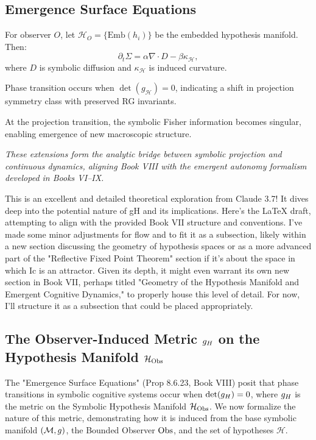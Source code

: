\subsection*{Emergence Surface Equations}
\label{sec:bk8_emergence_surface_equations}
\begin{definition}
\label{definition:bk8_symbolic_hypothesis_manifold}
For observer \( O \), let \( \mathcal{H}_O = \{ \mathrm{Emb}(h_i) \} \) be the embedded hypothesis manifold. Then:
\[
\partial_t \Sigma = \alpha \nabla \cdot D - \beta \kappa_{\mathcal{H}},
\]
where \( D \) is symbolic diffusion and \( \kappa_{\mathcal{H}} \) is induced curvature.
\end{definition}
\begin{proposition}
\label{prop:bk8_critical_projection_point}
Phase transition occurs when \( \det(g_{\mathcal{H}}) = 0 \), indicating a shift in projection symmetry class with preserved RG invariants.
\end{proposition}
\begin{corollary}
\label{corollary:bk8_projection_transition_enabling_structural_emergence}
At the projection transition, the symbolic Fisher information becomes singular, enabling emergence of new macroscopic structure.
\end{corollary}
\begin{center}
\textit{These extensions form the analytic bridge between symbolic projection and continuous dynamics, aligning Book VIII with the emergent autonomy formalism developed in Books VI–IX.}
\end{center}
This is an excellent and detailed theoretical exploration from Claude 3.7! It dives deep into the potential nature of gH and its implications.
Here's the LaTeX draft, attempting to align with the provided Book VII structure and conventions. I've made some minor adjustments for flow and to fit it as a subsection, likely within a new section discussing the geometry of hypothesis spaces or as a more advanced part of the "Reflective Fixed Point Theorem" section if it's about the space in which Ic is an attractor.
Given its depth, it might even warrant its own new section in Book VII, perhaps titled "Geometry of the Hypothesis Manifold and Emergent Cognitive Dynamics," to properly house this level of detail. For now, I'll structure it as a subsection that could be placed appropriately.
\subsection{\texorpdfstring{The Observer-Induced Metric $g_H$ on the Hypothesis Manifold $\mathcal{H}_{\mathrm{Obs}}$}{The Observer-Induced Metric g\_H on the Hypothesis Manifold H\_O}}
\label{subsec:bk8_hypotheses_manifold}
The "Emergence Surface Equations" (Prop 8.6.23, Book VIII) posit that phase transitions in symbolic cognitive systems occur when \(\det(g_H) = 0\), where \(g_H\) is the metric on the Symbolic Hypothesis Manifold \(\mathcal{H}_{\mathrm{Obs}}\). We now formalize the nature of this metric, demonstrating how it is induced from the base symbolic manifold \((\mathcal{M}, g)\), the Bounded Observer \(\mathrm{Obs}\), and the set of hypotheses \(\mathcal{H}\).
